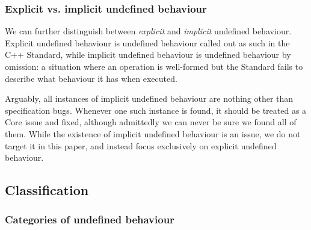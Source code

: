 \subsubsection{Explicit vs. implicit undefined behaviour}

We can further distinguish between \emph{explicit} and \emph{implicit} undefined behaviour. Explicit undefined behaviour is undefined behaviour called out as such in the C++ Standard, while implicit undefined behaviour is undefined behaviour by omission: a situation where an operation is well-formed but the Standard fails to describe what behaviour it has when executed.

Arguably, all instances of implicit undefined behaviour are nothing other than specification bugs. Whenever one such instance is found, it should be treated as a Core issue and fixed, although admittedly we can never be sure we found all of them. While the existence of implicit undefined behaviour is an issue, we do not target it in this paper, and instead focus exclusively on explicit undefined behaviour. 

\subsection{Classification}

\subsubsection{Categories of undefined behaviour}

